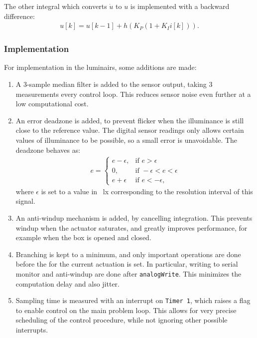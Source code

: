 \documentclass[english,fira]{ist-report}
\begin{document}
The other integral which converts $\Dot{u}$ to $u$ is implemented with a backward  difference:
\begin{align}
    u[k] = u[k-1] + h\left( K_P (1+K_I i[k]) \right).
\end{align}

\subsubsection{Implementation}

For implementation in the luminairs, some additions are made:
\begin{enumerate}
    \item A 3-sample median filter is added to the sensor output, taking 3 measurements every control loop. This reduces sensor noise even further at a low computational cost.
    \item An error deadzone is added, to prevent flicker when the illuminance is still close to the reference value. The digital sensor readings only allows certain values of illuminance to be possible, so a small error is unavoidable. The deadzone behaves as:
    \begin{align}
        e = 
        \begin{cases}
            e-\epsilon, & \text{if } e>\epsilon \\
            0,          & \text{if } -\epsilon<e<\epsilon \\
            e+\epsilon  & \text{if } e<-\epsilon,
        \end{cases}
        \label{eq:deadzone}
    \end{align}
    where $\epsilon$ is set to a value in \SI{}{\lux} corresponding to the resolution interval of this signal.
    \item An anti-windup mechanism is added, by cancelling integration. This prevents windup when the actuator saturates, and greatly improves performance, for example when the box is opened and closed.
    \item Branching is kept to a minimum, and only important operations are done before the for the current actuation is set. In particular, writing to serial monitor and anti-windup are done after \texttt{analogWrite}. This minimizes the computation delay and also jitter. 
    \item Sampling time is measured with an interrupt on \texttt{Timer 1}, which raises a flag to enable control on the main problem loop. This allows for very precise scheduling of the control procedure, while not ignoring other possible interrupts.
\end{enumerate}
\end{document}
